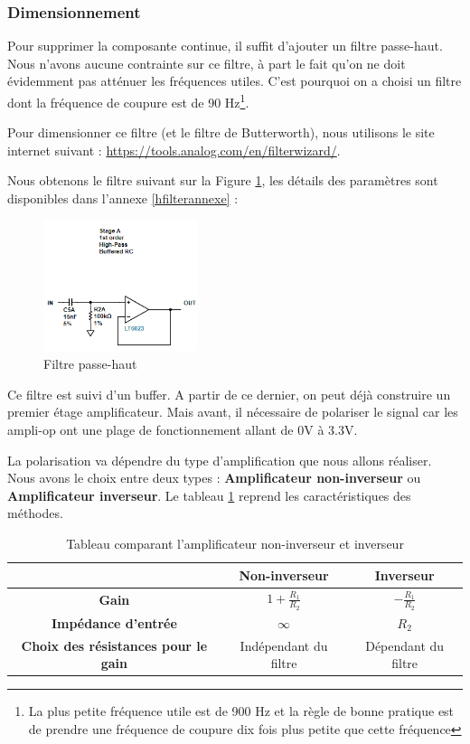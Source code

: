 \subsubsection{Dimensionnement}

Pour supprimer la composante continue, il suffit d'ajouter un filtre passe-haut. Nous n'avons aucune contrainte sur ce filtre, à part le fait qu'on ne doit évidemment pas atténuer les fréquences utiles. C'est pourquoi on a choisi un filtre dont la fréquence de coupure est de 90 Hz\footnote{La plus petite fréquence utile est de 900 Hz et la règle de bonne pratique est de prendre une fréquence de coupure dix fois plus petite que cette fréquence}. 

Pour dimensionner ce filtre (et le filtre de Butterworth), nous utilisons le site internet suivant : \url{https://tools.analog.com/en/filterwizard/}. 

Nous obtenons le filtre suivant sur la Figure \ref{fig:highpass}, les détails des paramètres sont disponibles dans l'annexe \ref{hfilterannexe} :

\begin{figure}[H]
    \centering
    \includegraphics[width=0.4\textwidth]{Pictures/highpassfilter.png}
    \caption{Filtre passe-haut}
    \label{fig:highpass}
\end{figure}

Ce filtre est suivi d'un buffer. A partir de ce dernier, on peut déjà construire  un premier étage amplificateur. Mais avant, il nécessaire de polariser le signal car les ampli-op ont une plage de fonctionnement allant de 0V à 3.3V.

La polarisation va dépendre du type d'amplification que nous allons réaliser. Nous avons le choix entre deux types : \textbf{Amplificateur non-inverseur} ou \textbf{Amplificateur inverseur}. Le tableau \ref{tab:tabamp} reprend les caractéristiques des méthodes.

\begin{table}[H]
    \centering
    \begin{tabular}{|c|c|c|}
    \hline
        \cellcolor[RGB]{100,100,100}&\textbf{Non-inverseur} & \textbf{Inverseur} \\
        \hline
         \textbf{Gain} & $1+\frac{R_1}{R_2}$ & $-\frac{R_1}{R_2}$\\ 
         \hline
         \textbf{Impédance d'entrée} &  $\infty$& $R_2$\\
         \hline
         \textbf{Choix des résistances pour le gain} & Indépendant du filtre & Dépendant du filtre \\
         \hline
    \end{tabular}
    \caption{Tableau comparant l'amplificateur non-inverseur et inverseur}
    \label{tab:tabamp}
\end{table}

